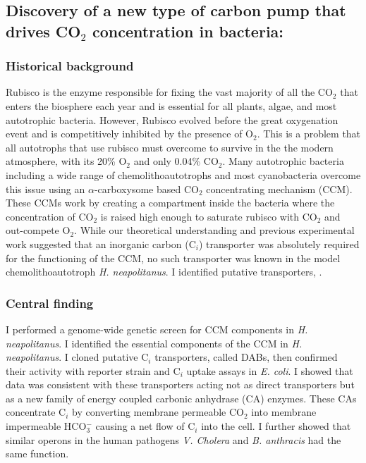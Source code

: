\documentclass{article}
\begin{document}
\leavevmode\pagebreak


\newrefsection
\subsection{Discovery of a new type of carbon pump that drives CO$_2$ concentration in bacteria:}
\subsubsection{Historical background}
Rubisco is the enzyme responsible for fixing the vast majority of all the CO$_2$ that enters the biosphere each year and is essential for all plants, algae, and most autotrophic bacteria. 
However, Rubisco evolved before the great oxygenation event and is competitively inhibited by the presence of O$_2$.
This is a problem that all autotrophs that use rubisco must overcome to survive in the the modern atmosphere, with its 20\% O$_2$ and only 0.04\% CO$_2$.
Many autotrophic bacteria including a wide range of chemolithoautotrophs and most cyanobacteria overcome this issue using an $\alpha$-carboxysome based CO$_2$ concentrating mechanism (CCM).
These CCMs work by creating a compartment inside the bacteria where the concentration of CO$_2$ is raised high enough to saturate rubisco with CO$_2$ and out-compete O$_2$.
While our theoretical understanding and previous experimental work suggested that an inorganic carbon (C$_i$) transporter was absolutely required for the functioning of the CCM, no such transporter was known in the model chemolithoautotroph \textit{H. neapolitanus}.
I identified putative transporters, .
%
\subsubsection{Central finding}
I performed a genome-wide genetic screen for CCM components in \textit{H. neapolitanus}. 
I identified the essential components of the CCM in \textit{H. neapolitanus}.
I cloned putative C$_i$ transporters, called DABs, then confirmed their activity with reporter strain and C$_i$ uptake assays in \textit{E. coli}. 
I showed that data was consistent with these transporters acting not as direct transporters but as a new family of energy coupled carbonic anhydrase (CA) enzymes.
These CAs concentrate C$_i$ by converting membrane permeable CO$_2$ into membrane impermeable HCO$_{3}^{-}$ causing a net flow of C$_i$ into the cell.
I further showed that similar operons in the human pathogens \textit{V. Cholera} and \textit{B. anthracis} had the same function.
%
\end{document}

